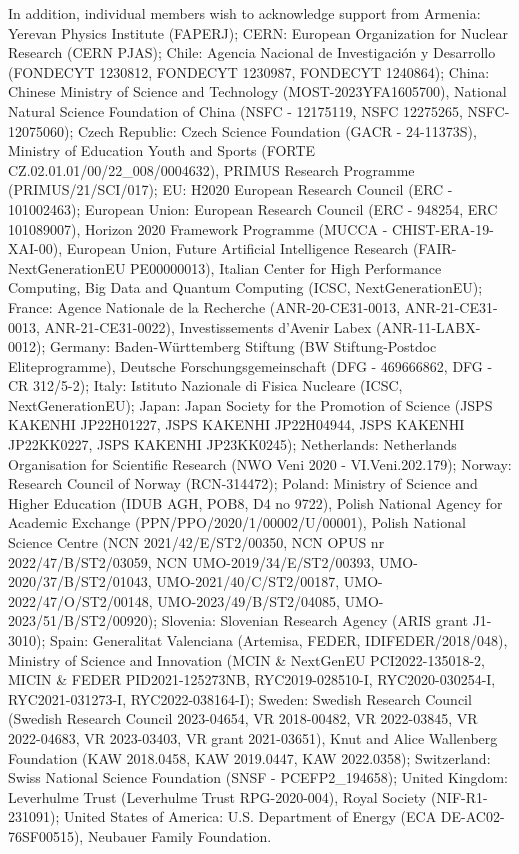 \documentclass[PAPER, atlasdraft=true, UKenglish, coverpage]{atlasdoc}
\begin{document}
In addition, individual members wish to acknowledge support from Armenia: Yerevan Physics Institute (FAPERJ); CERN: European Organization for Nuclear Research (CERN PJAS); Chile: Agencia Nacional de Investigaci\'on y Desarrollo (FONDECYT 1230812, FONDECYT 1230987, FONDECYT 1240864); China: Chinese Ministry of Science and Technology (MOST-2023YFA1605700), National Natural Science Foundation of China (NSFC - 12175119, NSFC 12275265, NSFC-12075060); Czech Republic: Czech Science Foundation (GACR - 24-11373S), Ministry of Education Youth and Sports (FORTE CZ.02.01.01/00/22\_008/0004632), PRIMUS Research Programme (PRIMUS/21/SCI/017); EU: H2020 European Research Council (ERC - 101002463); European Union: European Research Council (ERC - 948254, ERC 101089007), Horizon 2020 Framework Programme (MUCCA - CHIST-ERA-19-XAI-00), European Union, Future Artificial Intelligence Research (FAIR-NextGenerationEU PE00000013), Italian Center for High Performance Computing, Big Data and Quantum Computing (ICSC, NextGenerationEU); France: Agence Nationale de la Recherche (ANR-20-CE31-0013, ANR-21-CE31-0013, ANR-21-CE31-0022), Investissements d'Avenir Labex (ANR-11-LABX-0012); Germany: Baden-Württemberg Stiftung (BW Stiftung-Postdoc Eliteprogramme), Deutsche Forschungsgemeinschaft (DFG - 469666862, DFG - CR 312/5-2); Italy: Istituto Nazionale di Fisica Nucleare (ICSC, NextGenerationEU); Japan: Japan Society for the Promotion of Science (JSPS KAKENHI JP22H01227, JSPS KAKENHI JP22H04944, JSPS KAKENHI JP22KK0227, JSPS KAKENHI JP23KK0245); Netherlands: Netherlands Organisation for Scientific Research (NWO Veni 2020 - VI.Veni.202.179); Norway: Research Council of Norway (RCN-314472); Poland: Ministry of Science and Higher Education (IDUB AGH, POB8, D4 no 9722), Polish National Agency for Academic Exchange (PPN/PPO/2020/1/00002/U/00001), Polish National Science Centre (NCN 2021/42/E/ST2/00350, NCN OPUS nr 2022/47/B/ST2/03059, NCN UMO-2019/34/E/ST2/00393, UMO-2020/37/B/ST2/01043, UMO-2021/40/C/ST2/00187, UMO-2022/47/O/ST2/00148, UMO-2023/49/B/ST2/04085, UMO-2023/51/B/ST2/00920); Slovenia: Slovenian Research Agency (ARIS grant J1-3010); Spain: Generalitat Valenciana (Artemisa, FEDER, IDIFEDER/2018/048), Ministry of Science and Innovation (MCIN \& NextGenEU PCI2022-135018-2, MICIN \& FEDER PID2021-125273NB, RYC2019-028510-I, RYC2020-030254-I, RYC2021-031273-I, RYC2022-038164-I); Sweden: Swedish Research Council (Swedish Research Council 2023-04654, VR 2018-00482, VR 2022-03845, VR 2022-04683, VR 2023-03403, VR grant 2021-03651), Knut and Alice Wallenberg Foundation (KAW 2018.0458, KAW 2019.0447, KAW 2022.0358); Switzerland: Swiss National Science Foundation (SNSF - PCEFP2\_194658); United Kingdom: Leverhulme Trust (Leverhulme Trust RPG-2020-004), Royal Society (NIF-R1-231091); United States of America: U.S. Department of Energy (ECA DE-AC02-76SF00515), Neubauer Family Foundation.
\end{document}
